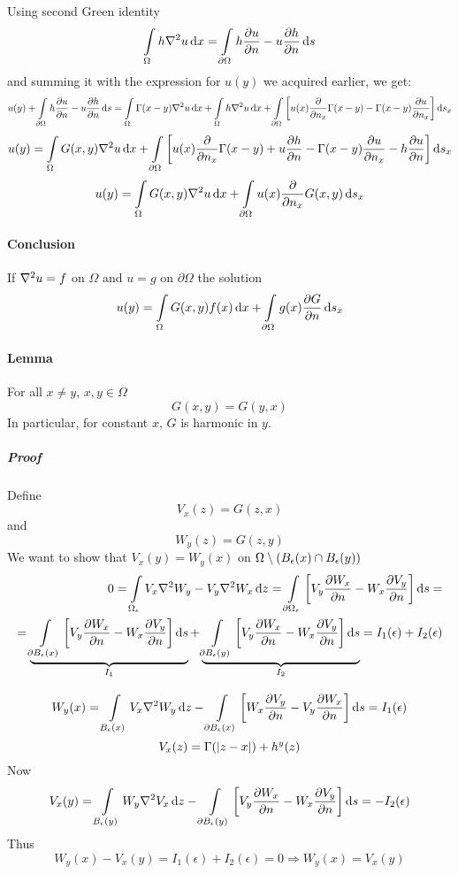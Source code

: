 Using second Green identity
$$\int\limits_{\Omega} h\laplacian{u} \dd{x} = \int\limits_{\partial \Omega} h \pdv{u}{n} - u \pdv{h}{n} \dd{s} $$
and summing it with the expression for $u(y)$ we acquired earlier, we get:
$$u(y) + \int\limits_{\partial \Omega} h \pdv{u}{n} - u \pdv{h}{n} \dd{s} = \int\limits_{\Omega} \Gamma(x-y) \laplacian{u} \dd{x} + \int\limits_{\Omega} h\laplacian{u} \dd{x}  + \int\limits_{\partial \Omega} \qty[u(x) \pdv{n_x}\Gamma(x-y) - \Gamma(x-y) \pdv{u}{n_x}] \dd{s_x} $$
$$u(y)  = \int\limits_{\Omega} G(x,y) \laplacian{u} \dd{x}   + \int\limits_{\partial \Omega} \qty[u(x) \pdv{n_x}\Gamma(x-y)  + u \pdv{h}{n} - \Gamma(x-y) \pdv{u}{n_x}- h \pdv{u}{n} ] \dd{s_x} $$
$$u(y) = \int\limits_{\Omega} G(x,y) \laplacian{u} \dd{x} + \int\limits_{\partial \Omega} u(x) \pdv{n_x}G(x,y) \dd{s_x}$$
\paragraph{Conclusion}
If $\laplacian{u} = f$ on $\Omega$ and $u=g$ on $\partial \Omega$
the solution
$$u(y) = \int\limits_{\Omega} G(x,y) f(x) \dd{x} + \int\limits_{\partial \Omega} g(x) \pdv{G}{n} \dd{s_x} $$
\paragraph{Lemma}
For all $x\neq y$, $x,y \in \Omega$
$$G(x,y) = G(y,x)$$
In particular, for constant $x$, $G$ is harmonic in $y$.
\subparagraph{Proof}
Define
$$V_x(z) = G(z,x)$$
and
$$W_y(z) = G(z,y)$$
We want to show that $V_x(y)= W_y(x)$ on $\Omega \setminus \qty(B_\epsilon(x) \cap B_\epsilon(y))$
\begin{align*}
0 = \int\limits_{\Omega_\epsilon} V_x\laplacian{W_y} -  V_y\laplacian{W_x} \dd{z} = \int\limits_{\partial \Omega_\epsilon} \qty[V_y \pdv{W_x}{n} - W_x \pdv{V_y}{n}] \dd{s} =\\= \underbrace{\int\limits_{\partial B_\epsilon(x) }\qty[V_y \pdv{W_x}{n} - W_x \pdv{V_y}{n}] \dd{s}}_{I_1} + \underbrace{\int\limits_{\partial B_\epsilon(y)} \qty[V_y \pdv{W_x}{n} - W_x \pdv{V_y}{n}] \dd{s}}_{I_2} = I_1(\epsilon) + I_2(\epsilon)
\end{align*}
$$$$
$$W_y(x) = \int\limits_{B_\epsilon(x)} V_x\laplacian{W_y} \dd{z} - \int\limits_{\partial B_\epsilon(x) }\qty[W_x \pdv{V_y}{n} - V_y \pdv{W_x}{n} ] \dd{s} = I_1(\epsilon)$$
$$V_x(z) = \Gamma(\abs{z-x}) + h^y(z)$$
Now
$$V_x(y) = \int\limits_{B_\epsilon(y)} W_y\laplacian{V_x} \dd{z} -  \int\limits_{\partial B_\epsilon(y)} \qty[V_y \pdv{W_x}{n} - W_x \pdv{V_y}{n}] \dd{s} = -I_2(\epsilon)$$
Thus
$$W_y(x) - V_x(y) = I_1(\epsilon) + I_2(\epsilon) = 0 \Rightarrow  W_y(x) = V_x(y)$$

